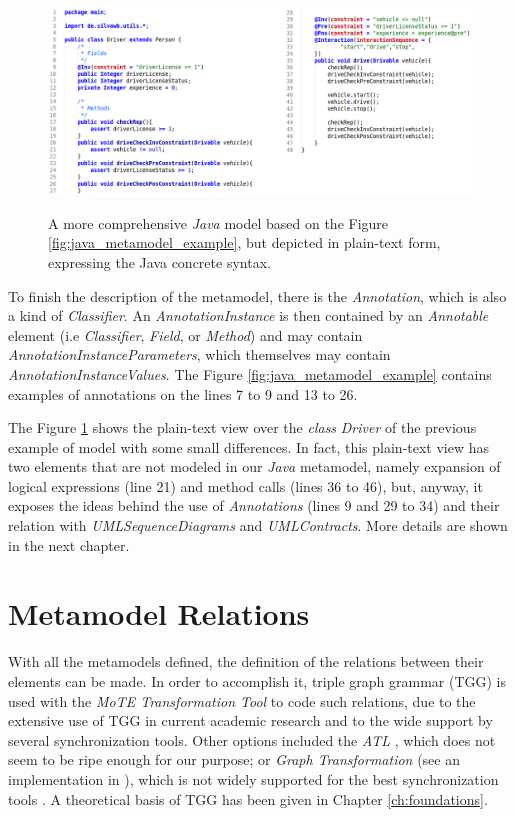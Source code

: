 \documentclass[tuberlin,cic,tc,english,noabntcite, oneside]{iiufrgs}
\begin{document}
\begin{figure}[H]
	\centering
    \caption{A more comprehensive \emph{Java} model based on the Figure \ref{fig:java_metamodel_example}, but depicted in plain-text form, expressing the Java concrete syntax.}
    \includegraphics[width=\textwidth]{javaMetamodelExample01_Text}
    \label{fig:java_metamodel_example_text01}
\end{figure}

To finish the description of the metamodel, there is the \emph{Annotation}, which is also a kind of \emph{Classifier}. An \emph{AnnotationInstance} is then contained by an \emph{Annotable} element (i.e \emph{Classifier}, \emph{Field}, or \emph{Method}) and may contain \emph{AnnotationInstanceParameters}, which themselves may contain \emph{AnnotationInstanceValues}. The Figure \ref{fig:java_metamodel_example} contains examples of annotations on the lines 7 to 9 and 13 to 26.

The Figure \ref{fig:java_metamodel_example_text01} shows the plain-text view over the \emph{class} \emph{Driver} of the previous example of model with some small differences. In fact, this plain-text view has two elements that are not modeled in our \emph{Java} metamodel, namely expansion of logical expressions (line 21) and method calls (lines 36 to 46), but, anyway, it exposes the ideas behind the use of \emph{Annotations} (lines 9 and 29 to 34) and their relation with \emph{UMLSequenceDiagrams} and \emph{UMLContracts}. More details are shown in the next chapter.

\section{Metamodel Relations}
\label{subsec:MetamodelRelations}
With all the metamodels defined, the definition of the relations between their elements can be made. In order to accomplish it, triple graph grammar (TGG) is used with the \emph{MoTE Transformation Tool} to code such relations, due to the extensive use of TGG in current academic research and to the wide support by several synchronization tools. Other options included the \emph{ATL} \citep{jouault2008atl}, which does not seem to be ripe enough for our purpose; or \emph{Graph Transformation} (see an implementation in \citealp{arendt2010henshin}), which is not widely supported for the best synchronization tools \citep{hildebrandt2013survey}. A theoretical basis of TGG has been given in Chapter \ref{ch:foundations}.
\end{document}
